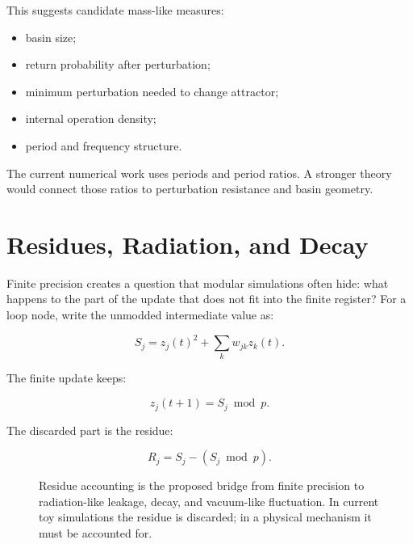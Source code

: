 \documentclass[11pt,a4paper]{article}
\begin{document}
This suggests candidate mass-like measures:

\begin{itemize}
\item basin size;
\item return probability after perturbation;
\item minimum perturbation needed to change attractor;
\item internal operation density;
\item period and frequency structure.
\end{itemize}

The current numerical work uses periods and period ratios. A stronger theory
would connect those ratios to perturbation resistance and basin geometry.

\section{Residues, Radiation, and Decay}

Finite precision creates a question that modular simulations often hide: what
happens to the part of the update that does not fit into the finite register?
For a loop node, write the unmodded intermediate value as:

\[
S_j = z_j(t)^2 + \sum_k w_{jk}z_k(t).
\]

The finite update keeps:

\[
z_j(t+1)=S_j \bmod p.
\]

The discarded part is the residue:

\[
R_j = S_j - (S_j \bmod p).
\]

\begin{figure}[htbp]
\centering
{}
\caption{Residue accounting is the proposed bridge from finite precision to
radiation-like leakage, decay, and vacuum-like fluctuation. In current toy
simulations the residue is discarded; in a physical mechanism it must be
accounted for.}
\label{fig:residue_schematic}
\end{figure}
\end{document}
